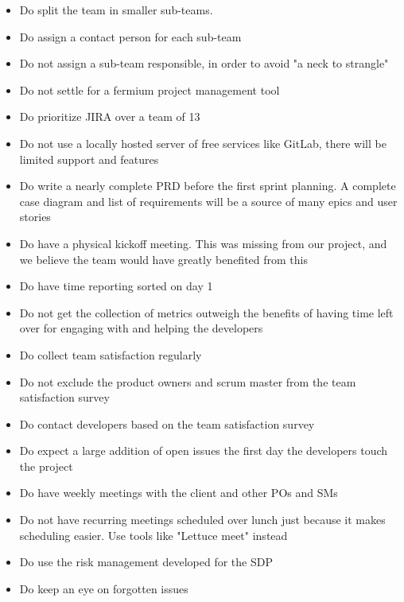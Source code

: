 \documentclass{article}
\begin{document}
\begin{itemize}
    \item Do split the team in smaller sub-teams.
    \item Do assign a contact person for each sub-team
    \item Do not assign a sub-team responsible, in order to avoid "a neck to strangle"
    \item Do not settle for a fermium project management tool
    \item Do prioritize JIRA over a team of 13
    \item Do not use a locally hosted server of free services like GitLab, there will be limited support and features
    \item Do write a nearly complete PRD before the first sprint planning. A complete case diagram and list of requirements will be a source of many epics and user stories
    \item Do have a physical kickoff meeting. This was missing from our project, and we believe the team would have greatly benefited from this
    \item Do have time reporting sorted on day 1
    \item Do not get the collection of metrics outweigh the benefits of having time left over for engaging with and helping the developers
    \item Do collect team satisfaction regularly
    \item Do not exclude the product owners and scrum master from the team satisfaction survey
    \item Do contact developers based on the team satisfaction survey
    \item Do expect a large addition of open issues the first day the developers touch the project
    \item Do have weekly meetings with the client and other POs and SMs
    \item Do not have recurring meetings scheduled over lunch just because it makes scheduling easier. Use tools like "Lettuce meet" instead
    \item Do use the risk management developed for the SDP
    \item Do keep an eye on forgotten issues
\end{itemize}
\end{document}
